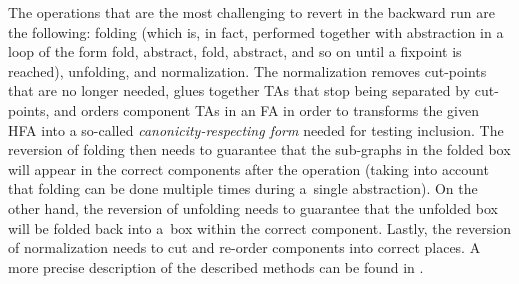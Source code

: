 The operations that are the most challenging to revert in the backward run are the following:
folding (which is, in fact, performed together with abstraction in a
loop of the form fold, abstract, fold, abstract, and so on until a fixpoint is
reached), unfolding, and normalization.
The normalization removes cut-points that are no longer needed, glues together TAs that stop
being separated by cut-points, and orders component TAs in an FA in order to
transforms the given HFA into a so-called \emph{canonicity-respecting form} needed for
testing inclusion.
The reversion of folding then needs to guarantee that the sub-graphs in the folded
box will appear in the correct components after the operation (taking into
account that folding can be done multiple times during a~single abstraction).
On the other hand, the reversion of unfolding needs to guarantee that the unfolded
box will be folded back into a~box within the correct component.
Lastly,
the reversion of normalization needs to cut and re-order components into correct places.
A more precise description of the described methods can be found in \cite{vmcai17}.




